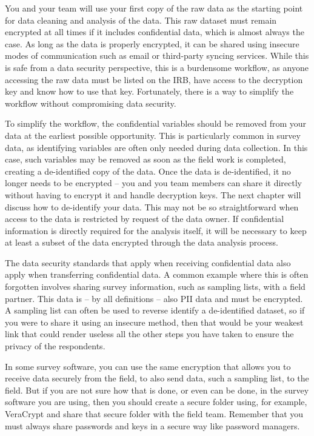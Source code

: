 You and your team will use your first copy of the raw data
as the starting point for data cleaning and analysis of the data.
This raw dataset must remain encrypted at all times if it includes confidential data,
which is almost always the case.
As long as the data is properly encrypted,
it can be shared using insecure modes of communication
such as email or third-party syncing services.
While this is safe from a data security perspective,
this is a burdensome workflow, as anyone accessing the raw data must be listed on the IRB,
have access to the decryption key and know how to use that key.
Fortunately, there is a way to simplify the workflow without compromising data security.

To simplify the workflow,
the confidential variables should be removed from your data at the earliest possible opportunity.
This is particularly common in survey data,
as identifying variables are often only needed during data collection.
In this case, such variables may be removed as soon as the field work is completed,
creating a de-identified copy of the data.
Once the data is de-identified,
it no longer needs to be encrypted --
you and you team members can share it directly
without having to encrypt it and handle decryption keys.
The next chapter will discuss how to de-identify your data.
This may not be so straightforward when access to the data
is restricted by request of the data owner.
If confidential information is directly required for the analysis itself,
it will be necessary to keep at least a subset of the data encrypted through the data analysis process.

The data security standards that apply when receiving confidential data also apply when transferring confidential data.
A common example where this is often forgotten involves sharing survey information,
such as sampling lists, with a field partner.
This data is -- by all definitions -- also PII data and must be encrypted.
A sampling list can often be used to reverse identify a de-identified dataset,
so if you were to share it using an insecure method,
then that would be your weakest link that could render useless all the other steps
you have taken to ensure the privacy of the respondents.

In some survey software, you can use the same encryption that allows you to receive data securely
from the field, to also send data, such a sampling list, to the field.
But if you are not sure how that is done, or even can be done,
in the survey software you are using,
then you should create a secure folder using, for example,
VeraCrypt and share that secure folder with the field team.
Remember that you must always share passwords and keys in a secure way like password managers.

